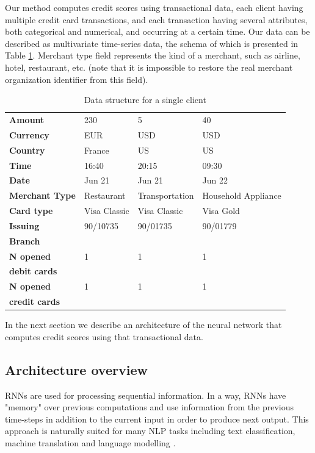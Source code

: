 \documentclass[sigconf]{acmart}
\begin{document}
Our method computes credit scores using transactional data,
each client having multiple credit card transactions, and each transaction having several attributes, both categorical and numerical, and occurring at a certain time. Our data can be described as multivariate time-series data, the schema of which is presented in Table \ref{tab-tr-data}. Merchant type field represents the kind of a merchant, such as airline, hotel, restaurant, etc. (note that it is impossible to restore the real merchant organization identifier from this field).

\begin{table}[ht]
\caption{Data structure for a single client}
\begin{tabular}{ | m{7em} |  m{5em} m{5em} m{5em}| }
\hline
\textbf{Amount} & 230 & 5 & 40 \\
\textbf{Currency} & EUR & USD & USD \\
\textbf{Country} & France & US & US \\
\textbf{Time} & 16:40 & 20:15 & 09:30 \\
\textbf{Date} & Jun 21 & Jun 21 & Jun 22 \\
\textbf{Merchant Type} & Restaurant & Transport\-ation & Household Appliance \\
\textbf{Card type} & Visa Classic & Visa Classic & Visa Gold \\
\textbf{Issuing} & 90/10735 & 90/01735 & 90/01779 \\
\textbf{Branch} &&& \\
\textbf{N opened} & 1 & 1& 1 \\
\textbf{debit cards} &&& \\
\textbf{N opened} & 1 & 1& 1 \\
\textbf{credit cards} &&& \\
\hline
\end{tabular}
\label{tab-tr-data}
\end{table}

In the next section we describe an architecture of the neural network that computes credit scores using that transactional data.

\subsection{Architecture overview}

RNNs are used for processing sequential information.  In a way, RNNs have "memory" over previous computations and use information from the previous time-steps in addition to the current input in order to produce next output. This approach is naturally suited for many NLP tasks including text classification, machine translation and language modelling \cite{mikolov2010recurrent}.
\end{document}
